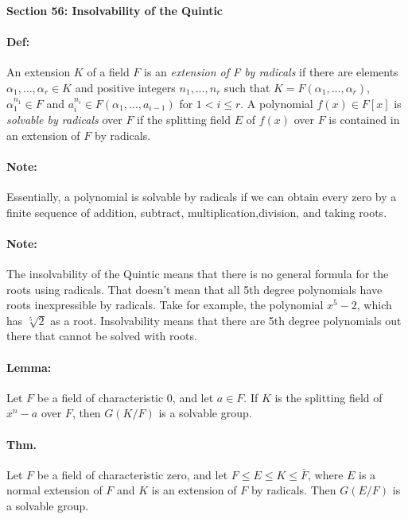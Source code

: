 \documentclass[10pt,a4paper]{article}
\begin{document}
\begin{center}
\textbf{Section 56: Insolvability of the Quintic}
\end{center}

\paragraph{Def:} An extension $K$ of a field $F$ is an \textit{extension of F by radicals} if there are elements $\alpha_1, \dots, \alpha_r \in K$ and positive integers $n_1, \dots, n_r$ such that $K=F(\alpha_1, \dots, \alpha_r)$, $\alpha_1^{n_1} \in F$ and $a_i^{n_i} \in F(\alpha_1, \dots, a_{i-1})$ for $1 < i \leq r$. A polynomial $f(x) \in F[x]$ is \textit{solvable by radicals} over $F$ if the splitting field $E$ of $f(x)$ over $F$ is contained in an extension of $F$ by radicals.

\paragraph{Note:} Essentially, a polynomial is solvable by radicals if we can obtain every zero by a finite sequence of addition, subtract, multiplication,division, and taking roots.

\paragraph{Note:} The insolvability of the Quintic means that there is no general formula for the roots using radicals. That doesn't mean that all 5th degree polynomials have roots inexpressible by radicals. Take for example, the polynomial $x^5-2$, which has $\sqrt[5]{2}$ as a root. Insolvability means that there are 5th degree polynomials out there that cannot be solved with roots.

\paragraph{Lemma:} Let $F$ be a field of characteristic 0, and let $a \in F$. If $K$ is the splitting field of $x^n-a$ over $F$, then $G(K/F)$ is a solvable group.

\paragraph{Thm.} Let $F$ be a field of characteristic zero, and let $F \leq E \leq K \leq \bar{F}$, where $E$ is a normal extension of $F$ and $K$ is an extension of $F$ by radicals. Then $G(E/F)$ is a solvable group.
\end{document}
